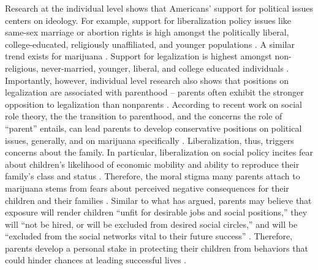 Research at the individual level shows that Americans' support for political issues centers on ideology. For example, support for liberalization policy issues like same-sex marriage or abortion rights is high amongst the politically liberal, college-educated, religiously unaffiliated, and younger populations \citep{baunach_2012,zucker_1999,pew_2017_ssm,pew_2017_ab}. A similar trend exists for  marijuana \citep{caulkins_et_al_2012,newhart_and_dolphin_2018,schnabel_and_sevell_2017,rosenthal_and_kubby_1996}. Support for legalization is highest amongst non-religious, never-married, younger, liberal, and college educated individuals \citep{schnabel_and_sevell_2017,pew_2015,elder_and_greene_2019,eagly_et_al_2004,newhart_and_dolphin_2018,rosenthal_and_kubby_1996}. %
Importantly, however, individual level research also shows that positions on legalization are associated with parenthood -- parents often exhibit the stronger opposition to legalization than nonparents \citep{elder_and_greene_2019,mosher_and_akins_2019,newhart_and_dolphin_2018,caulkins_et_al_2012,rosenthal_and_kubby_1996}. According to recent work on social role theory, the the transition to parenthood, and the concerns the role of ``parent'' entails, can lead parents to develop conservative positions on political issues, generally, and on marijuana specifically \citep{elder_and_greene_2019}. %
Liberalization, thus, triggers concerns about the family. In particular, liberalization on social policy incites fear about children's likelihood of economic mobility and ability to reproduce their family's class and status \citep{beisel_1997,gusfield_1963,eskridge_and_speadle_2006}. Therefore, the moral stigma many parents attach to marijuana stems from fears about perceived negative consequences for their children and their families \citep{elder_and_greene_2019,lynskey_and_hall_2000,kandel_et_al_1986,lifrak_et_al_1997,fergusson_et_al_2002,kandel_2002,rosenthal_and_kubby_1996}. Similar to what \citet[5]{beisel_1997} has argued, parents may believe that exposure will render children ``unfit for desirable jobs and social positions,'' they will ``not be hired, or will be excluded from desired social circles,'' and will be ``excluded from the social networks vital to their future success'' \citep[199]{beisel_1997}. Therefore, parents develop a personal stake in protecting their children from behaviors that could hinder chances at leading successful lives \citep{beisel_1997,gusfield_1963}. 


